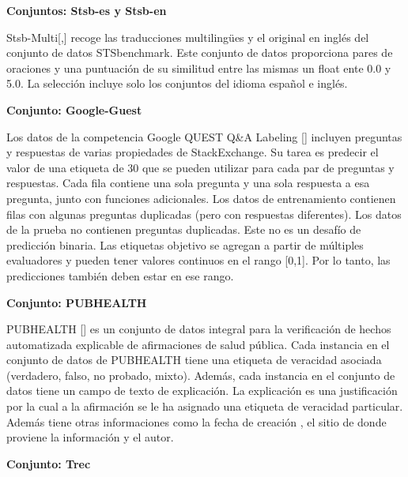 \begin{annexes}
\begin{flushleft} 
    { \textbf{Conjuntos: Stsb-es y Stsb-en}}\label{description:stsb}
\end{flushleft}

Stsb-Multi[\cite{stsb},\cite{stsb2}] recoge las traducciones multilingües y el original en inglés del conjunto de datos STSbenchmark. 
Este conjunto de datos proporciona pares de oraciones y una puntuación de su similitud entre las mismas un float ente 0.0 y 5.0. La selección incluye solo los conjuntos 
del idioma español e inglés. 

\begin{flushleft} 
    { \textbf{Conjunto: Google-Guest}}\label{description:google}
\end{flushleft}

Los datos de la competencia Google QUEST Q\&A Labeling [\cite{google-quest}] incluyen preguntas y respuestas de varias propiedades de StackExchange. Su tarea es predecir 
el valor de una etiqueta de 30 que se pueden utilizar para cada par de preguntas y respuestas. Cada fila contiene una sola pregunta y una sola respuesta a esa pregunta, junto con 
funciones adicionales. Los datos de entrenamiento contienen filas con algunas preguntas duplicadas (pero con respuestas diferentes). Los datos de la prueba no contienen 
preguntas duplicadas. Este no es un desafío de predicción binaria. Las etiquetas objetivo se agregan a partir de múltiples evaluadores y pueden tener valores continuos 
en el rango [0,1]. Por lo tanto, las predicciones también deben estar en ese rango. 

\begin{flushleft} 
    { \textbf{Conjunto: PUBHEALTH}}\label{description:pubhealth}
\end{flushleft}

PUBHEALTH [\cite{pubhealth}] es un conjunto de datos integral para la verificación de hechos automatizada explicable de afirmaciones de salud pública. Cada instancia en el conjunto de 
datos de PUBHEALTH tiene una etiqueta de veracidad asociada (verdadero, falso, no probado, mixto). Además, cada instancia en el conjunto de datos tiene un campo de 
texto de explicación. La explicación es una justificación por la cual a la afirmación se le ha asignado una etiqueta de veracidad particular. Además tiene otras 
informaciones como la fecha de creación , el sitio de donde proviene la información y el autor.

\begin{flushleft} 
    { \textbf{Conjunto: Trec}}\label{description:trec}
\end{flushleft}


\end{annexes}
